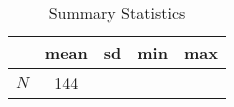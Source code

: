 \begin{table}[htbp]\centering
\def\sym#1{\ifmmode^{#1}\else\(^{#1}\)\fi}
\caption{Summary Statistics}
\begin{tabular}{l*{1}{cccc}}
\toprule
            &        mean&          sd&         min&         max\\
\midrule
\midrule
\(N\)       &         144&            &            &            \\
\bottomrule
\end{tabular}
\end{table}
